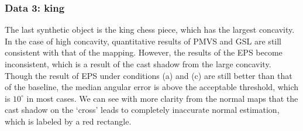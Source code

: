 \subsubsection{Data 3: king}
The last synthetic object is the king chess piece, which has the largest concavity. In the case of high concavity, quantitative results of PMVS and GSL are still consistent with that of the mapping. However, the results of the EPS become inconsistent, which is a result of the cast shadow from the large concavity. Though the result of EPS under conditions (a) and (c) are still better than that of the baseline, the median angular error is above the acceptable threshold, which is $10^\circ$ in most cases. We can see with more clarity from the normal maps that the cast shadow on the `cross' leads to completely inaccurate normal estimation, which is labeled by a red rectangle.
